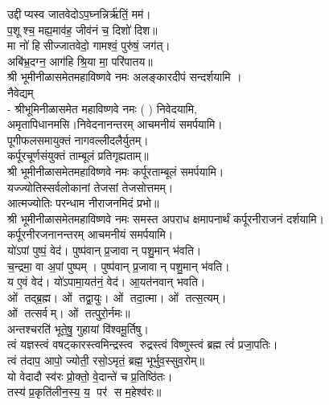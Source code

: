 उद्दीप्यस्व जातवेदोऽप॒घ्नन्निर्ऋ॑तिं॒ मम॑।\\
 प॒शूश्च॒ मह्य॒माव॑ह॒ जीव॑नं च॒ दिशो॑ दिश॥ \\
मा नो॑ हिसीज्जातवेदो॒ गामश्वं॒ पुरु॑षं॒ जग॑त्।\\
अबि॑भ्र॒दग्न॒ आग॑हि श्रि॒या मा॒ परि॑पातय॥ \\
श्री भूमीनीळासमेतमहाविष्णवे नमः अलङ्कारदीपं सन्दर्शयामि ।\\

नैवेद्यम्\\
- श्रीभूमिनीळासमेत महाविष्णवे नमः (	) निवेदयामि, \\
अमृतापिधानमसि।निवेदनानन्तरम् आचमनीयं समर्पयामि।\\

पूगीफलसमायुक्तं नागवल्लीदलैर्युतम्।\\
कर्पूरचूर्णसंयुक्तं ताम्बूलं प्रतिगृह्यताम्॥\\
श्री भूमीनीळासमेतमहाविष्णवे नमः कर्पूरताम्बूलं समर्पयामि।\\

यज्ज्योतिस्सर्वलोकानां तेजसां तेजसोत्तमम्।\\
आत्मज्योतिः परन्धाम नीराजनमिदं प्रभो॥\\
श्री भूमीनीळासमेतमहाविष्णवे नमः समस्त अपराध क्षमापनार्थं कर्पूरनीराजनं दर्शयामि।\\
कर्पूरनीरजनानन्तरम् आचमनीयं समर्पयामि।\\

 यो॑ऽपां पुष्पं॒ वेद॑। पुष्प॑वान् प्र॒जावान् पशु॒मान् भ॑वति।\\
च॒न्द्रमा॒ वा अ॒पां पुष्पम्। पुष्प॑वान् प्र॒जावान् पशु॒मान् भ॑वति।\\
य ए॒वं वेद॑। यो॑ऽपामा॒यत॑नं॒ वेद॑। आ॒यत॑नवान् भवति।\\

ओं तद्ब्र॒ह्म। ओं तद्वा॒युः। ओं तदा॒त्मा। ओं तत्स॒त्यम्‌।\\
ओं तत्सर्वम्‌। ओं तत्पुरो॒र्नमः॥\\

अन्तश्चरति॑ भूते॒षु॒ गुहायां वि॑श्वमू॒र्तिषु। \\
त्वं यज्ञस्त्वं वषट्कारस्त्वमिन्द्रस्त्व रुद्रस्त्वं विष्णुस्त्वं ब्रह्म त्वं॑ प्रजा॒पतिः। \\
त्वं त॑दाप॒ आपो॒ ज्योती॒ रसो॒ऽमृतं॒ ब्रह्म॒ भूर्भुव॒स्सुव॒रोम्‌॥\\

यो वेदादौ स्व॑रः प्रो॒क्तो॒ वे॒दान्ते॑ च प्र॒तिष्ठि॑तः।\\
तस्य॑ प्र॒कृति॑लीन॒स्य॒ य॒ पर॑ स म॒हेश्व॑रः॥\\

